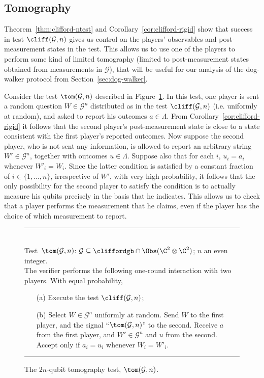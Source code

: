 \subsection{Tomography}
\label{subsec:tomography}

Theorem~\ref{thm:clifford-ntest} and Corollary~\ref{cor:clifford-rigid} show that success in test $\cliff(\mathcal{G},n)$ gives us control on the players' observables and post-measurement states in the test. This allows us to use one of the players to perform some kind of limited tomography (limited to post-measurement states obtained from measurements in $\mathcal{G}$), that will be useful for our analysis of the dog-walker protocol from Section~\ref{sec:dog-walker}.

 Consider the test $\tom(\mathcal{G},n)$ described in Figure~\ref{fig:tomography-test}. In this test, one player is sent a random question $W\in\mathcal{G}^n$ distributed as in the test $\cliff(\mathcal{G},n)$ (i.e. uniformly at random), and asked to report his outcomes $a\in\Lambda$. From  Corollary~\ref{cor:clifford-rigid} it follows that the second player's post-measurement state is close to a state consistent with the first player's reported outcomes. Now suppose the second player, who is not sent any information, is allowed to report an arbitrary string $W'\in \mathcal{G}^n$, together with outcomes $u\in\Lambda$. Suppose also that for each $i$, $u_i=a_i$ whenever $W'_i=W_i$. Since the latter condition is satisfied by a constant fraction of $i\in\{1,\ldots,n\}$, irrespective of $W'$, with very high probability, it follows that the only possibility for the second player to satisfy the condition is to actually measure his qubits precisely in the basis that he indicates. This allows us to check that a player performs the measurement that he claims, even if the player has the choice of which measurement to report. 

\begin{figure}[H]
\rule[1ex]{16.5cm}{0.5pt}\\
Test~$\tom(\mathcal{G},n)$: $\mathcal{G} \subseteq \cliffordgb \cap \Obs(\C^2\otimes \C^2)$; $n$ an even integer.  \\
The verifier performs the following one-round interaction with two
players.  With equal probability,
\begin{enumerate}
\item[(a)] Execute the test $\cliff(\mathcal{G},n)$; 
\item[(b)] Select $W\in\mathcal{G}^n$ uniformly at random. Send $W$ to the first player, and the signal ``$\tom(\mathcal{G},n)$'' to the second. Receive $a$ from the first player, and $W'\in\mathcal{G}^n$ and $u$ from the second. Accept only if $a_i=u_i$ whenever $W_i=W'_i$. 
\end{enumerate}
\rule[2ex]{16.5cm}{0.5pt}\vspace{-1cm}
\caption{The $2n$-qubit tomography test, $\tom(\mathcal{G},n)$.}
\label{fig:tomography-test}
\end{figure} 


